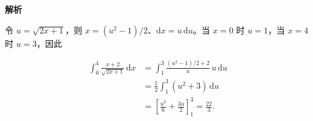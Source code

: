 \begin{answer}
\textbf{解析}

令 $u=\sqrt{2x+1}$，则 $x=(u^2-1)/2$、$\mathrm dx=u\,\mathrm du$。当 $x=0$ 时 $u=1$，当 $x=4$ 时 $u=3$，因此

\nopagebreak[4]
\[
\begin{aligned}
\int_0^4\frac{x+2}{\sqrt{2x+1}}\,\mathrm dx
&=\int_1^3\frac{(u^2-1)/2+2}{u}\,u\,\mathrm du\\
&=\frac12\int_1^3(u^2+3)\,\mathrm du\\
&=\left[\frac{u^3}{6}+\frac{3u}{2}\right]_1^3
=\frac{22}{3}.
\end{aligned}
\]



\end{answer}